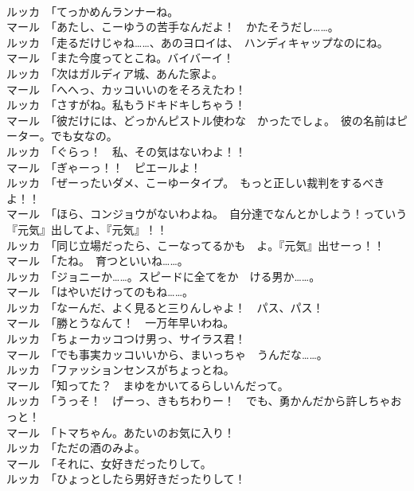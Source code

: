 \documentclass[8pt]{extreport}
\begin{document}
\begin{CJK}{UTF8}{min}
\\	ルッカ　「てっかめんランナーね。	
\\	マール　「あたし、こーゆうの苦手なんだよ！　かたそうだし……。	
\\	ルッカ　「走るだけじゃね……、あのヨロイは、　ハンディキャップなのにね。	
\\	マール　「また今度ってとこね。バイバーイ！	
\\	ルッカ　「次はガルディア城、あんた家よ。	
\\	マール　「へへっ、カッコいいのをそろえたわ！	
\\	ルッカ　「さすがね。私もうドキドキしちゃう！	
\\	マール　「彼だけには、どっかんピストル使わな　かったでしょ。　彼の名前はピーター。でも女なの。	
\\	ルッカ　「ぐらっ！　私、その気はないわよ！！	
\\	マール　「ぎゃーっ！！　ピエールよ！	
\\	ルッカ　「ぜーったいダメ、こーゆータイプ。　もっと正しい裁判をするべきよ！！	
\\	マール　「ほら、コンジョウがないわよね。　自分達でなんとかしよう！っていう　『元気』出してよ、『元気』！！	
\\	ルッカ　「同じ立場だったら、こーなってるかも　よ。『元気』出せーっ！！	
\\	マール　「たね。　育つといいね……。	
\\	ルッカ　「ジョニーか……。スピードに全てをか　ける男か……。	
\\	マール　「はやいだけってのもね……。	
\\	ルッカ　「なーんだ、よく見ると三りんしゃよ！　パス、パス！	
\\	マール　「勝とうなんて！　一万年早いわね。	
\\	ルッカ　「ちょーカッコつけ男っ、サイラス君！	
\\	マール　「でも事実カッコいいから、まいっちゃ　うんだな……。	
\\	ルッカ　「ファッションセンスがちょっとね。	
\\	マール　「知ってた？　まゆをかいてるらしいんだって。	
\\	ルッカ　「うっそ！　げーっ、きもちわりー！　でも、勇かんだから許しちゃおっと！	
\\	マール　「トマちゃん。あたいのお気に入り！	
\\	ルッカ　「ただの酒のみよ。	
\\	マール　「それに、女好きだったりして。	
\\	ルッカ　「ひょっとしたら男好きだったりして！	

\end{CJK}
\end{document}
